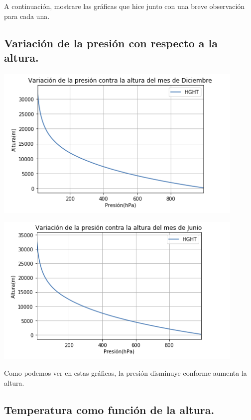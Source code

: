 \documentclass{article}
\begin{document}
A continuación, mostrare las gráficas que hice junto con una breve observación para cada una.

\subsection{Variación de la presión con respecto a la altura.}

\begin{center}
	\includegraphics[width=12cm]{graph1D.png}
\end{center}

\begin{center}
	\includegraphics[width=12cm]{graph1J.png}
\end{center}
\vspace{0.3cm}

Como podemos ver en estas gráficas, la presión disminuye conforme aumenta la altura.

\subsection{Temperatura como función de la altura.}
\end{document}

